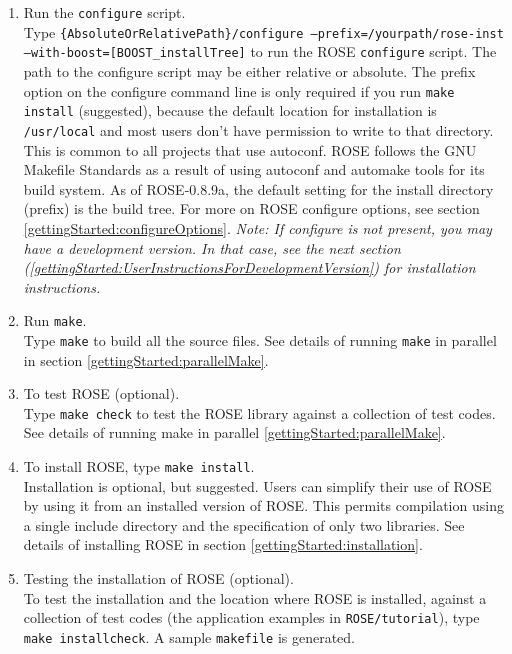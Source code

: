 \begin{enumerate}
     \item Run the {\tt configure} script. \\
           Type {\tt \{AbsoluteOrRelativePath\}/configure
           --prefix=/yourpath/rose-inst --with-boost=[BOOST\_installTree]} 
           to run the ROSE {\tt configure} script.  The path to the configure script 
           may be either relative or absolute. The prefix option on the configure 
           command line is only required if you run {\tt make install} (suggested), because 
           the default location for installation is {\tt \//usr\//local} and most users don't
           have permission to write to that directory. This is common to all projects that
           use autoconf.  ROSE follows the GNU Makefile Standards as a result of using
           autoconf and automake tools for its build system. As of ROSE-0.8.9a, the
           default setting for the install directory (prefix) is the build tree.
           For more on ROSE configure options, see section \ref{gettingStarted:configureOptions}.
           {\em Note: If configure is not present, you may have a development version. 
           In that case, see the next section
           (\ref{gettingStarted:UserInstructionsForDevelopmentVersion}) for installation instructions.}

     \item Run {\tt make}. \\
           Type {\tt make} to build all the source files. See details of running 
           {\tt make} in parallel in section \ref{gettingStarted:parallelMake}.

     \item To test ROSE (optional). \\
           Type {\tt make check} to test the ROSE library against a collection of test codes.
           See details of running make in parallel \ref{gettingStarted:parallelMake}.

     \item To install ROSE, type {\tt make install}. \\
           Installation is optional, but suggested. Users can simplify their use of ROSE 
           by using it from an installed version of ROSE.  This permits compilation 
           using a single include directory and the specification of only two libraries.
           See details of installing ROSE in section \ref{gettingStarted:installation}.

     \item Testing the installation of ROSE (optional). \\
           To test the installation and the location where ROSE is installed, against a
           collection of test codes (the application examples in {\tt ROSE/tutorial}), 
           type {\tt make installcheck}.
           A sample {\tt makefile} is generated.%
\end{enumerate}

